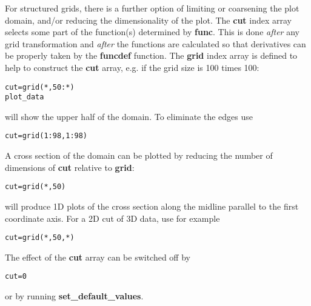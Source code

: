 \documentclass{article}
\begin{document}
For structured grids, there is a further option of limiting or coarsening
the plot domain, and/or reducing the dimensionality of the plot.
The {\bf cut} index array selects some part of the function(s)
determined by {\bf func}.
This is done {\em after} any grid transformation and {\em after} 
the functions are calculated so that derivatives can be properly taken 
by the {\bf funcdef} function.
The {\bf grid} index array is defined to help to construct
the {\bf cut} array, e.g. if the grid size is 100 times 100:
\begin{verbatim}
cut=grid(*,50:*)
plot_data
\end{verbatim}
will show the upper half of the domain. To eliminate the edges use
\begin{verbatim}
cut=grid(1:98,1:98)
\end{verbatim}
A cross section of the domain can be plotted by reducing
the number of dimensions of {\bf cut} relative to {\bf grid}:
\begin{verbatim}
cut=grid(*,50)
\end{verbatim}
will produce 1D plots of the cross section along the midline parallel to 
the first coordinate axis. For a 2D cut of 3D data, use for example
\begin{verbatim}
cut=grid(*,50,*)
\end{verbatim}
   The effect of the {\bf cut} array can be switched off by 
\begin{verbatim}
cut=0
\end{verbatim}
or by running {\bf set\_default\_values}.
\end{document}
